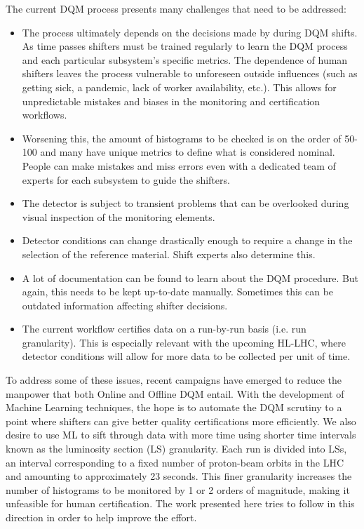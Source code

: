 The current DQM process presents many challenges that need to be addressed:
\begin{itemize}
	\item The process ultimately depends on the decisions made by during DQM shifts. As time passes shifters must be trained regularly to learn the DQM process and each particular subsystem's specific metrics. The dependence of human shifters leaves the process vulnerable to unforeseen outside influences (such as getting sick, a pandemic, lack of worker availability, etc.). This allows for unpredictable mistakes and biases in the monitoring and certification workflows.

	\item  Worsening this, the amount of histograms to be checked is on the order of 50-100 and many have unique metrics to define what is considered nominal. People can make mistakes and miss errors even with a dedicated team of experts for each subsystem to guide the shifters.

	\item The detector is subject to transient problems that can be overlooked during visual inspection of the monitoring elements. \cite{ML4DQM}

	\item Detector conditions can change drastically enough to require a change in the selection of the reference material. Shift experts also determine this.

	\item A lot of documentation can be found to learn about the DQM procedure. But again, this needs to be kept up-to-date manually. Sometimes this can be outdated information affecting shifter decisions.

	\item The current workflow certifies data on a run-by-run basis (i.e. run granularity). This is especially relevant with the upcoming HL-LHC, where detector conditions will allow for more data to be collected per unit of time.
\end{itemize}

To address some of these issues, recent campaigns have emerged to reduce the manpower that both Online and Offline DQM entail. With the development of Machine Learning techniques, the hope is to automate the DQM scrutiny to a point where shifters can give better quality certifications more efficiently. We also desire to use ML to sift through data with more time using shorter time intervals known as the luminosity section (LS) granularity.
Each run is divided into LSs, an interval corresponding to a fixed number of proton-beam orbits in the LHC and amounting to approximately 23 seconds.
This finer granularity increases the number of histograms to be monitored by 1 or 2 orders of magnitude, making it unfeasible for human certification\cite{ML4DQM}. The work presented here tries to follow in this direction in order to help improve the effort.

